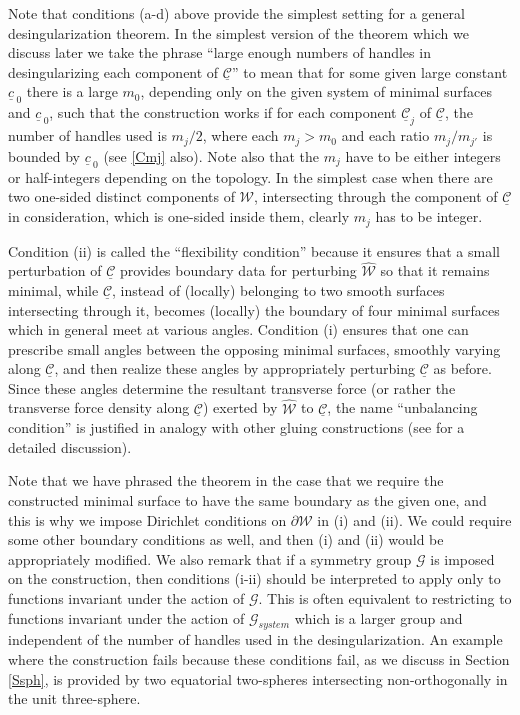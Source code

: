 \documentclass[12pt,namelimits,sumlimits]{amsart}
\theoremstyle{remark}
\numberwithin{equation}{section}
\begin{document}
Note that conditions (a-d) above provide the simplest setting for a general desingularization theorem.
In the simplest version of the theorem which we discuss later we take the phrase
``large enough numbers of handles in desingularizing each component of ${\underline{{\mathcal{C}}}}$''
to mean that for some given large constant ${\underline{c}\,}_0$ there is a large $m_0$,
depending only on the given system of minimal surfaces and ${\underline{c}\,}_0$,
such that the construction works if for each component ${\underline{{\mathcal{C}}}}_j$ of ${\underline{{\mathcal{C}}}}$,
the number of handles used is $m_j/2$, where 
each $m_j>m_0$ and each ratio $m_j/m_{j'}$ is bounded by ${\underline{c}\,}_0$ (see \ref{Cmj} also).
Note also that the $m_j$ have to be either integers or half-integers depending on the topology.
In the simplest case when there are two one-sided distinct components of ${{\mathcal{W}}}$,
intersecting through the component of ${\underline{{\mathcal{C}}}}$ in consideration,
which is one-sided inside them,
clearly $m_j$ has to be integer.

Condition (ii) is called the ``flexibility condition'' because it ensures that a small
perturbation of ${\underline{{\mathcal{C}}}}$
provides boundary data for perturbing ${{\widehat{{\mathcal{W}}}}}$ so that it remains minimal,
while ${\underline{{\mathcal{C}}}}$, instead of (locally) belonging to two smooth surfaces intersecting through it,
becomes (locally) the boundary of four minimal surfaces which in general meet at various angles.
Condition (i) ensures that one can prescribe small angles between the opposing minimal surfaces,
smoothly varying along ${\underline{{\mathcal{C}}}}$,
and then realize these angles by appropriately perturbing ${\underline{{\mathcal{C}}}}$ as before.
Since these angles determine the resultant transverse force
(or rather the transverse force density along ${\underline{{\mathcal{C}}}}$)
exerted by ${{\widehat{{\mathcal{W}}}}}$ to ${\underline{{\mathcal{C}}}}$,
the name ``unbalancing condition'' is justified in analogy with other gluing constructions
(see \cite{kapouleas:survey} for a detailed discussion).

Note that we have phrased the theorem in the case that we require the constructed minimal surface
to have the same boundary as the given one, and this is why we impose Dirichlet conditions on $\partial{{\mathcal{W}}}$
in (i) and (ii).
We could require some other boundary conditions as well,
and then (i) and (ii) would be appropriately modified.
We also remark that if a symmetry group ${{\mathscr{G}}}$ is imposed on the construction,
then conditions (i-ii) should be interpreted to apply only to functions invariant under the action of
${{\mathscr{G}}}$.
This is often equivalent to restricting to functions invariant under the action of ${{\mathscr{G}_{system}}}$
which is a larger group and independent of the number of handles used in the desingularization.
An example where the construction fails because these conditions fail,
as we discuss in Section \ref{Ssph},
is provided by two equatorial two-spheres intersecting non-orthogonally in the unit three-sphere.
\end{document}
